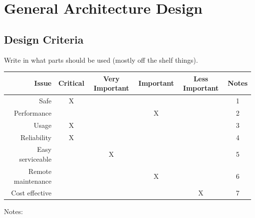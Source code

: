 \section{General Architecture Design}

\subsection{Design Criteria}
Write in what parts should be used (mostly off the shelf things).
\begin{table}[H]
	\begin{tabular}{| r | c | c | c | c | c |}
	\hline
		Issue & Critical & Very Important & Important & Less Important & Notes \\ \hline
		Safe					& X & ~ & ~ & ~ & 1 \\ \hline
		Performance 			& ~ & ~ & X & ~ & 2 \\ \hline
		Usage 				& X & ~ & ~ & ~ & 3 \\ \hline
		Reliability 			& X & ~ & ~ & ~ & 4 \\ \hline
		Easy serviceable 		& ~ & X & ~ & ~ & 5 \\ \hline
		Remote maintenance 	& ~ & ~ & X & ~ & 6 \\ \hline
		Cost effective 			& ~ & ~ & ~ & X & 7 \\ \hline
	\end{tabular}
	\end{table}
Notes:
